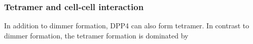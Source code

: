 \subsubsection{Tetramer and cell-cell interaction}

In addition to dimmer formation, DPP4 can also form tetramer. In contrast to dimmer formation, the tetramer formation is dominated by 